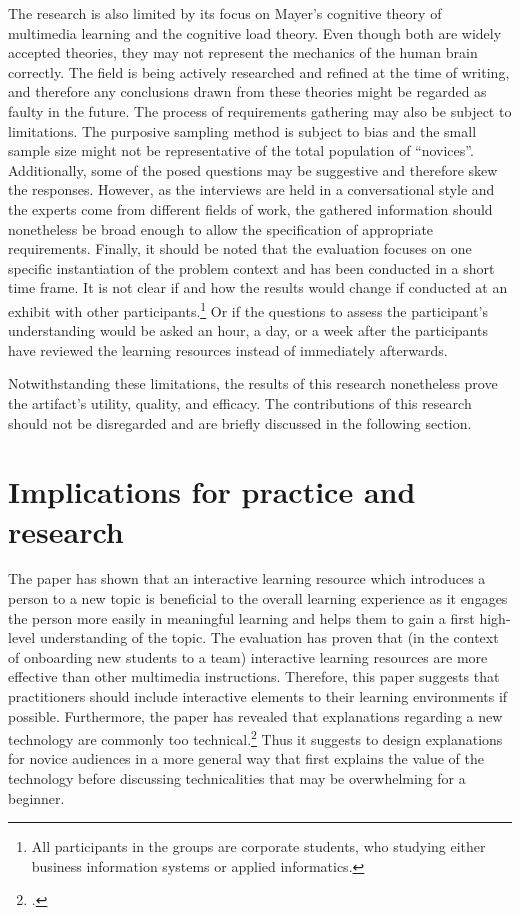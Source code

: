 The research is also limited by its focus on Mayer's cognitive theory of multimedia learning and the cognitive load theory. Even though both are widely accepted theories, they may not represent the mechanics of the human brain correctly. The field is being actively researched and refined at the time of writing, and therefore any conclusions drawn from these theories might be regarded as faulty in the future. The process of requirements gathering may also be subject to limitations. The purposive sampling method is subject to bias and the small sample size might not be representative of the total population of \enquote{novices}. Additionally, some of the posed questions may be suggestive and therefore skew the responses. However, as the interviews are held in a conversational style and the experts come from different fields of work, the gathered information should nonetheless be broad enough to allow the specification of appropriate requirements. Finally, it should be noted that the evaluation focuses on one specific instantiation of the problem context and has been conducted in a short time frame. It is not clear if and how the results would change if conducted at an exhibit with other participants.\footnote{All participants in the groups are corporate students, who studying either business information systems or applied informatics.} Or if the questions to assess the participant's understanding would be asked an hour, a day, or a week after the participants have reviewed the learning resources instead of immediately afterwards.

Notwithstanding these limitations, the results of this research nonetheless prove the artifact's utility, quality, and efficacy. The contributions of this research should not be disregarded and are briefly discussed in the following section. 

\section{Implications for practice and research} \label{Implications}
The paper has shown that an interactive learning resource which introduces a person to a new topic is beneficial to the overall learning experience as it engages the person more easily in meaningful learning and helps them to gain a first high-level understanding of the topic. The evaluation has proven that (in the context of onboarding new students to a team) interactive learning resources are more effective than other multimedia instructions. Therefore, this paper suggests that practitioners should include interactive elements to their learning environments if possible. Furthermore, the paper has revealed that explanations regarding a new technology are commonly too technical.\footcite[Cf.][]{DanielKaltenbach_Interview} Thus it suggests to design explanations for novice audiences in a more general way that first explains the value of the technology before discussing technicalities that may be overwhelming for a beginner.

